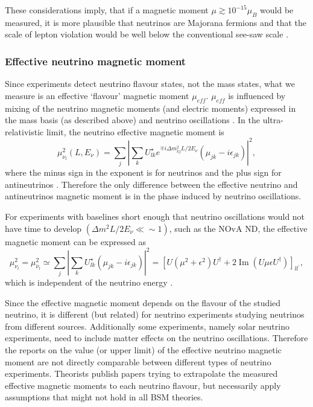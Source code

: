 
These considerations imply, that if a magnetic moment $\mu\gtrsim 10^{-15}\mu_B$ would be measured, it is more plausible that neutrinos are Majorana fermions and that the scale of lepton violation would be well below the conventional see-saw scale \cite{nuMMMajoranaBounds2006.pdf} .

\subsubsection{Effective neutrino magnetic moment}
Since experiments detect neutrino flavour states, not the mass states, what we measure is an effective `flavour' magnetic moment $\mu_{eff}$. $\mu_{eff}$ is influenced by mixing of the neutrino magnetic moments (and electric moments) expressed in the mass basis (as described above) and neutrino oscillations . In the ultra-relativistic limit, the neutrino effective magnetic moment is
\begin{equation}
\mu_{\nu_l}^2\left(L,E_{\nu}\right)=\sum_j\left|\sum_k U^{\star}_{lk}e^{\mp i\Delta m^2_{kj}L/2E_{\nu}}\left(\mu_{jk}-i\epsilon_{jk}\right)\right|^2,
\end{equation}
where the minus sign in the exponent is for neutrinos and the plus sign for antineutrinos \cite{nuElmagInt2015.pdf}. Therefore the only difference between the effective neutrino and antineutrinos magnetic moment is in the phase induced by neutrino oscillations.

For experiments with baselines short enough that neutrino oscillations would not have time to develop $\left(\Delta m^2L/2E_{\nu}\ll\sim1\right)$, such as the \gls{NOvA} \gls{ND}, the effective magnetic moment can be expressed as
\begin{equation}
\mu_{\nu_l}^2=\mu_{\overline{\nu}_l}^2\simeq\sum_j\left|\sum_k U_{lk}^{\star}\left(\mu_{jk}-i\epsilon_{jk}\right)\right|^2=\left[U\left(\mu^2+\epsilon^2\right)U^{\dagger}+2\operatorname{Im}\left(U\mu\epsilon U^{\dagger}\right)\right]_{ll^{\prime}},
\end{equation}
which is independent of the neutrino energy .

Since the effective magnetic moment depends on the flavour of the studied neutrino, it is different (but related) for neutrino experiments studying neutrinos from different sources. Additionally some experiments, namely solar neutrino experiments, need to include matter effects on the neutrino oscillations. Therefore the reports on the value (or upper limit) of the effective neutrino magnetic moment are not directly comparable between different types of neutrino experiments. Theorists publish papers trying to extrapolate the measured effective magnetic moments to each neutrino flavour, but necessarily apply assumptions that might not hold in all \gls{BSM} theories.

